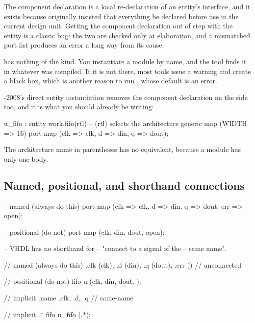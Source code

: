
The \VHDL{} component declaration is a local re-declaration of an entity's
interface, and it exists because \VHDL{} originally insisted that everything be
declared before use in the current design unit. Getting the component
declaration out of step with the entity is a classic \VHDL{} bug: the two are
checked only at elaboration, and a mismatched port list produces an error a
long way from its cause.

\SV{} has nothing of the kind. You instantiate a module by name, and the tool
finds it in whatever was compiled. If it is not there, most tools issue a
warning and create a black box, which is another reason to run
, whose default is an error.

\VHDL{}-2008's direct entity instantiation removes the component declaration on
the \VHDL{} side too, and it is what you should already be writing:

\begin{vhdlcode}[caption={Direct entity instantiation: the modern \VHDL{} form.},label={lst:rosetta:direct}]
u_fifo : entity work.fifo(rtl)      -- (rtl) selects the architecture
  generic map (WIDTH => 16)
  port map (clk => clk, d => din, q => dout);
\end{vhdlcode}

The architecture name in parentheses has no \SV{} equivalent, because a module
has only one body.

\subsection{Named, positional, and shorthand connections}

\begin{rosetta}
\begin{rleft}
-- named (always do this)
port map (clk => clk,
          d   => din,
          q   => dout,
          err => open);

-- positional (do not)
port map (clk, din, dout, open);

-- VHDL has no shorthand for
-- "connect to a signal of the
-- same name".
\end{rleft}
\begin{rright}
// named (always do this)
.clk (clk),
.d   (din),
.q   (dout),
.err ()          // unconnected

// positional (do not)
fifo u (clk, din, dout, );

// implicit .name
.clk, .d, .q     // same-name

// implicit .*
fifo u_fifo (.*);
\end{rright}
\end{rosetta}

